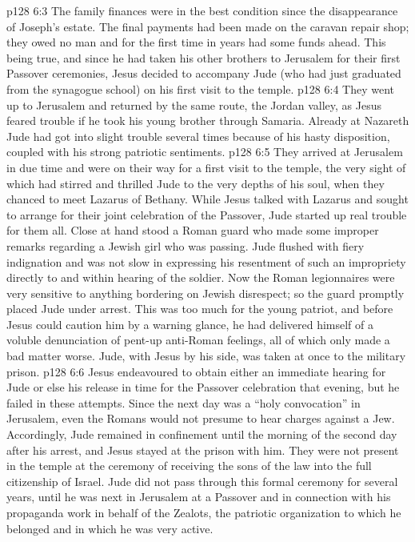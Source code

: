 \vs p128 6:3 \pc The family finances were in the best condition since the disappearance of Joseph’s estate. The final payments had been made on the caravan repair shop; they owed no man and for the first time in years had some funds ahead. This being true, and since he had taken his other brothers to Jerusalem for their first Passover ceremonies, Jesus decided to accompany Jude (who had just graduated from the synagogue school) on his first visit to the temple.
\vs p128 6:4 They went up to Jerusalem and returned by the same route, the Jordan valley, as Jesus feared trouble if he took his young brother through Samaria. Already at Nazareth Jude had got into slight trouble several times because of his hasty disposition, coupled with his strong patriotic sentiments.
\vs p128 6:5 They arrived at Jerusalem in due time and were on their way for a first visit to the temple, the very sight of which had stirred and thrilled Jude to the very depths of his soul, when they chanced to meet Lazarus of Bethany. While Jesus talked with Lazarus and sought to arrange for their joint celebration of the Passover, Jude started up real trouble for them all. Close at hand stood a Roman guard who made some improper remarks regarding a Jewish girl who was passing. Jude flushed with fiery indignation and was not slow in expressing his resentment of such an impropriety directly to and within hearing of the soldier. Now the Roman legionnaires were very sensitive to anything bordering on Jewish disrespect; so the guard promptly placed Jude under arrest. This was too much for the young patriot, and before Jesus could caution him by a warning glance, he had delivered himself of a voluble denunciation of pent\hyp{}up anti\hyp{}Roman feelings, all of which only made a bad matter worse. Jude, with Jesus by his side, was taken at once to the military prison.
\vs p128 6:6 Jesus endeavoured to obtain either an immediate hearing for Jude or else his release in time for the Passover celebration that evening, but he failed in these attempts. Since the next day was a “holy convocation” in Jerusalem, even the Romans would not presume to hear charges against a Jew. Accordingly, Jude remained in confinement until the morning of the second day after his arrest, and Jesus stayed at the prison with him. They were not present in the temple at the ceremony of receiving the sons of the law into the full citizenship of Israel. Jude did not pass through this formal ceremony for several years, until he was next in Jerusalem at a Passover and in connection with his propaganda work in behalf of the Zealots, the patriotic organization to which he belonged and in which he was very active.
